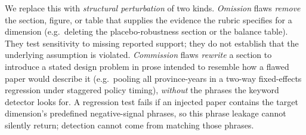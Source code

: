 We replace this with \emph{structural perturbation} of two kinds.
\emph{Omission} flaws \emph{remove} the section, figure, or table that supplies
the evidence the rubric specifies for a dimension (e.g.\ deleting the
placebo-robustness section or the balance table). They test sensitivity to
missing reported support; they do not establish that the underlying assumption
is violated. \emph{Commission} flaws \emph{rewrite} a section to introduce a
stated design problem in prose intended to resemble how a flawed paper would
describe it (e.g.\ pooling all province-years in a two-way fixed-effects
regression under staggered policy timing), \emph{without} the phrases the
keyword detector looks for. A regression test fails if an injected paper
contains the target dimension's predefined negative-signal phrases, so this
phrase leakage cannot silently return; detection cannot come from matching
those phrases.

